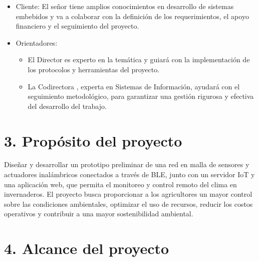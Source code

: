 \documentclass[
11pt, %
codirector, %
]{charter}
\begin{document}
\begin{itemize}
	\item Cliente: El señor \clientename\hspace{1px} tiene amplios conocimientos en desarrollo de sistemas embebidos y va a colaborar con la definición
	      de los requerimientos, el apoyo financiero y el seguimiento del proyecto.
	\item Orientadores:
	      \begin{itemize}
		      \item El Director \supname\hspace{1px} es experto en la temática y guiará con la implementación de los protocolos y herramientas del proyecto.
		      \item La Codirectora \cosupname , experta en Sistemas de Información, ayudará con el seguimiento metodológico, para garantizar una gestión
		            rigurosa y efectiva del desarrollo del trabajo.
	      \end{itemize}
\end{itemize}


\section{3. Propósito del proyecto}
\label{sec:proposito}

Diseñar y desarrollar un prototipo preliminar de una red en malla de sensores y actuadores inalámbricos conectados a través de BLE, junto con un servidor
IoT y una aplicación web, que permita el monitoreo y control remoto del clima en invernaderos. El proyecto busca proporcionar a los agricultores un mayor
control sobre las condiciones  ambientales, optimizar el uso de recursos, reducir los costos operativos y contribuir a una mayor sostenibilidad ambiental.

\section{4. Alcance del proyecto}
\label{sec:alcance}
\end{document}
